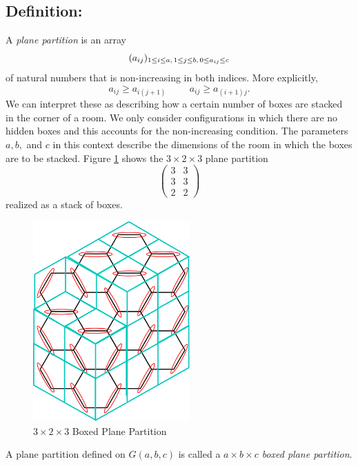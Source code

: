 \documentclass{article}
\begin{document}
\subsection{Definition:} A \textit{plane partition} is an array 
$$
(a_{ij})_{1 \leq i \leq a, \hspace{.5mm} 1 \leq j \leq b, \hspace{.5mm}  0 \leq a_{ij} \leq c}
$$ 
of natural numbers that is non-increasing in both indices. More explicitly,
$$
a_{ij} \geq a_{i(j+1)} \hspace{1cm} a_{ij} \geq a_{(i+1)j}.
$$
We can interpret these as describing how a certain number of boxes are stacked in the corner of a room. We only consider configurations in which there are no hidden boxes and this accounts for the non-increasing condition. The parameters $a,b,$ and $c$ in this context describe the dimensions of the room in which the boxes are to be stacked. Figure \ref{fig:box_stack} shows the $3 \times 2 \times 3$ plane partition 
$$
\begin{pmatrix}
3 & 3\\
3 & 3 \\
2 & 2
\end{pmatrix}
$$
realized as a stack of boxes. 
	\begin{figure}[h]
\begin{minipage}{\textwidth}
	\begin{center}
 	\includegraphics[width=6cm]{box_stack_1.png}
  	\caption{$3 \times 2 \times 3$ Boxed Plane Partition}
	 \label{fig:box_stack}
 	 \end{center}
 \end{minipage}	
\end{figure} 
A plane partition defined on $G(a,b,c)$ is called a \textit{$a\times b \times c$ boxed plane partition}. 
\end{document}
